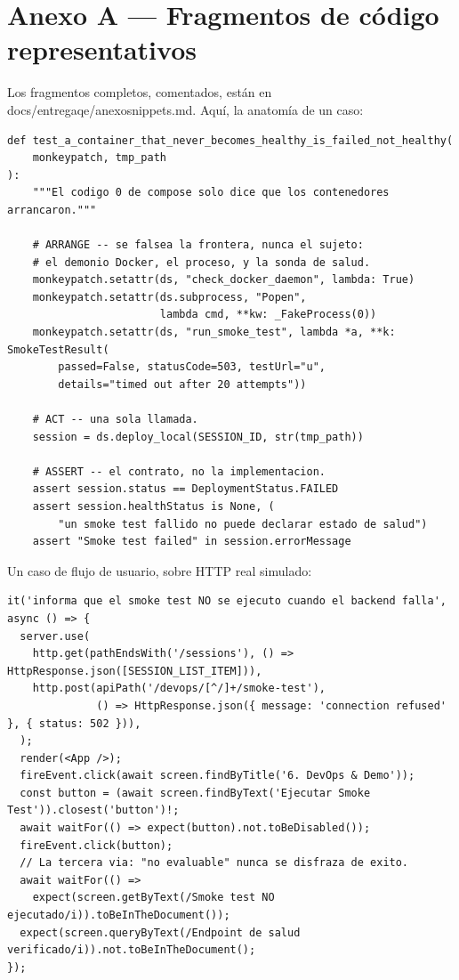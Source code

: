 \documentclass[11pt,a4paper]{article}
\newcommand{\code}[1]{{\ttfamily\small\def\_{\textunderscore\allowbreak}#1}}
\begin{document}
\section{Anexo A --- Fragmentos de código representativos}

Los fragmentos completos, comentados, están en
\code{docs/entrega\_qe/anexo\_snippets.md}. Aquí, la anatomía de un caso:

\begin{lstlisting}
def test_a_container_that_never_becomes_healthy_is_failed_not_healthy(
    monkeypatch, tmp_path
):
    """El codigo 0 de compose solo dice que los contenedores arrancaron."""

    # ARRANGE -- se falsea la frontera, nunca el sujeto:
    # el demonio Docker, el proceso, y la sonda de salud.
    monkeypatch.setattr(ds, "check_docker_daemon", lambda: True)
    monkeypatch.setattr(ds.subprocess, "Popen",
                        lambda cmd, **kw: _FakeProcess(0))
    monkeypatch.setattr(ds, "run_smoke_test", lambda *a, **k: SmokeTestResult(
        passed=False, statusCode=503, testUrl="u",
        details="timed out after 20 attempts"))

    # ACT -- una sola llamada.
    session = ds.deploy_local(SESSION_ID, str(tmp_path))

    # ASSERT -- el contrato, no la implementacion.
    assert session.status == DeploymentStatus.FAILED
    assert session.healthStatus is None, (
        "un smoke test fallido no puede declarar estado de salud")
    assert "Smoke test failed" in session.errorMessage
\end{lstlisting}

\noindent Un caso de flujo de usuario, sobre HTTP real simulado:

\begin{lstlisting}
it('informa que el smoke test NO se ejecuto cuando el backend falla', async () => {
  server.use(
    http.get(pathEndsWith('/sessions'), () => HttpResponse.json([SESSION_LIST_ITEM])),
    http.post(apiPath('/devops/[^/]+/smoke-test'),
              () => HttpResponse.json({ message: 'connection refused' }, { status: 502 })),
  );
  render(<App />);
  fireEvent.click(await screen.findByTitle('6. DevOps & Demo'));
  const button = (await screen.findByText('Ejecutar Smoke Test')).closest('button')!;
  await waitFor(() => expect(button).not.toBeDisabled());
  fireEvent.click(button);
  // La tercera via: "no evaluable" nunca se disfraza de exito.
  await waitFor(() =>
    expect(screen.getByText(/Smoke test NO ejecutado/i)).toBeInTheDocument());
  expect(screen.queryByText(/Endpoint de salud verificado/i)).not.toBeInTheDocument();
});
\end{lstlisting}
\end{document}

